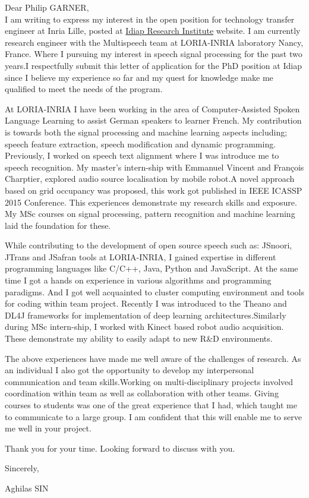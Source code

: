 \documentclass[10pt,a4paper]{letter}
\begin{document}
Dear Philip GARNER,\\

		I am writing to express my interest in the open position for technology transfer engineer at Inria Lille, posted at \href{https://www.idiap.ch/education-and-jobs}{Idiap Research Institute} website. I am currently research engineer with the Multispeech team at LORIA-INRIA laboratory Nancy, France. Where I pursuing my interest in speech signal processing for the past two years.I respectfully submit this letter of application for the PhD position at 
Idiap since I believe my experience so far and my quest for knowledge 
make me qualified to meet the needs of the program. 
		
		At LORIA-INRIA I have been working in the area of Computer-Assisted Spoken Language Learning to assist German speakers to learner French. My contribution is towards both the signal processing and machine learning aspects including; speech feature extraction, speech modification and dynamic programming. Previously, I worked on speech text alignment where I was  introduce me to speech recognition. My master's intern-ship with Emmanuel Vincent and François Charptier, explored audio source localisation by mobile robot.A novel approach based on grid occupancy was proposed, this work got published in IEEE ICASSP 2015 Conference.  This experiences demonstrate my research skills and exposure. My MSc courses on signal processing, pattern recognition and machine learning laid the foundation for these.   

		
		While contributing to the development of open source speech such as: JSnoori, JTrans and JSafran tools at LORIA-INRIA, I gained expertise in different programming languages like C/C++, Java, Python and JavaScript. At the same time I got a hands on experience in various algorithms and programming paradigms. And I got well acquainted 	to cluster computing environment	and tools for coding within team project. Recently I was introduced to the Theano and DL4J frameworks for implementation of deep learning architectures.Similarly during MSc intern-ship, I worked with Kinect based robot audio acquisition. These demonstrate my ability to easily adapt to new
 R\&D environments.    
		
		The above experiences have made me well aware of the challenges of research. As an individual I also got the opportunity to develop my interpersonal communication and team 		
skills.Working on multi-disciplinary projects involved coordination within  team as well as collaboration with other teams. Giving courses to students was one of the great experience that I had, which taught me to communicate to a large group. I am confident that this will enable me to serve me well in your project.

	Thank you for your time. Looking forward to discuss with you.
	
Sincerely,

Aghilas SIN 
	
		
\end{document}
